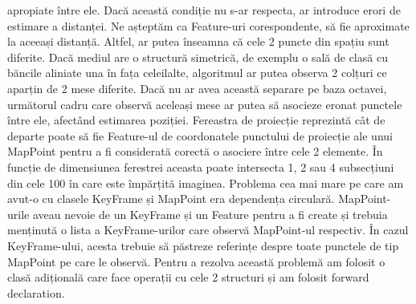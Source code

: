 \documentclass[12pt,a4paper]{report}
\begin{document}
apropiate între ele. Dacă această condiție nu s-ar respecta, ar introduce erori de estimare 
a distanței. Ne așteptăm ca Feature-uri corespondente, să fie aproximate la aceeași distanță.
Altfel, ar putea înseamna că cele 2 puncte din spațiu sunt diferite. Dacă mediul are o structură 
simetrică, de exemplu o sală de clasă cu băncile aliniate una în fața celeilalte, algoritmul 
ar putea observa 2 colțuri ce aparțin de 2 mese diferite. Dacă nu ar avea această separare 
pe baza octavei, următorul cadru care observă aceleași mese ar putea să asocieze eronat punctele 
între ele, afectând estimarea poziției. Fereastra de proiecție reprezintă cât de departe poate 
să fie Feature-ul de coordonatele punctului de proiecție ale unui MapPoint pentru a fi considerată
corectă o asociere între cele 2 elemente. În funcție de dimensiunea ferestrei aceasta poate intersecta 1, 2 sau 4 subsecțiuni din cele 100 în care 
este împărțită imaginea. Problema cea mai mare pe care am avut-o cu clasele KeyFrame și MapPoint
era dependența circulară. MapPoint-urile aveau nevoie de un KeyFrame și un Feature pentru a fi 
create și trebuia menținută o lista a KeyFrame-urilor care observă MapPoint-ul respectiv.
În cazul KeyFrame-ului, acesta trebuie să păstreze referințe despre toate punctele de tip MapPoint pe 
care le observă. Pentru a rezolva această problemă am folosit o clasă adițională care face 
operații cu cele 2 structuri și am folosit forward declaration.  \\  
\end{document}
